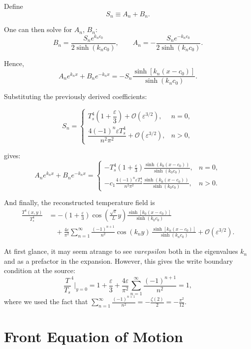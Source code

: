 \documentclass{article}
\begin{document}
Define
\[
S_n \equiv A_n + B_n.
\]

One can then solve for $A_n$, $B_n$:
\[
B_n = \frac{S_n e^{k_n c_0}}{2\sinh(k_n c_0)}, 
\qquad
A_n = -\frac{S_n e^{-k_n c_0}}{2\sinh(k_n c_0)}.
\]

Hence,
\[
A_n e^{k_n x} + B_n e^{-k_n x}
= - S_n \frac{\sinh[k_n(x-c_0)]}{\sinh(k_n c_0)}.
\]

Substituting the previously derived coefficients:

\[
S_n =
\begin{cases}
T_s^4\!\left(1+\dfrac{\varepsilon}{3}\right) + \mathcal{O}(\varepsilon^{3/2}), & n=0,\\[8pt]
\dfrac{4(-1)^n \varepsilon T_s^4}{n^2\pi^2} + \mathcal{O}(\varepsilon^{3/2}), & n>0,
\end{cases}
\]

gives:
\begin{equation}
    A_n e^{k_n x} + B_n e^{-k_n x} =
    \begin{cases}
        - T_s^4 (1+\frac{\varepsilon}{3}) \frac{\sinh(k_0(x-c_0))}{\sinh(k_0 c_0)}, & n=0,\\[6pt]
        -c_1 \frac{4(-1)^n \varepsilon T_s^4}{n^2\pi^2}\frac{\sinh(k_0(x-c_0))}{\sinh(k_0 c_0)}, & n>0.
    \end{cases}
\end{equation}
 
And finally, the reconstructed temperature field is
\begin{equation}
\begin{split}
\frac{T^4(x,y)}{T_s^4}
&=
-\left(1+\frac{\varepsilon}{3}\right) \cos\!\left(\frac{\sqrt{\varepsilon}}{L}y\right) \frac{\sinh[k_0(x-c_0)]}{\sinh(k_0 c_0)} \\
&\quad+ \frac{4\varepsilon}{\pi^2} \sum_{n=1}^{\infty} \frac{(-1)^{n+1}}{n^2} \cos(k_n y)\, \frac{\sinh[k_n(x-c_0)]}{\sinh(k_n c_0)} + \mathcal{O}(\varepsilon^{3/2}).
\end{split}
\end{equation}

At first glance, it may seem atrange to see $varepsilon$ both in the eigenvalues $k_n$ and as a prefactor in the expansion. However, this gives the write boundary condition at the source:
\[
\frac{T}{T_s}^4 \bigg|_{y=0} = 1+ \frac{\varepsilon}{3} + \frac{4\varepsilon}{\pi^2}\sum_{n=1}^\infty \frac{(-1)^{n+1}}{n^2} = 1,
\]
where we used the fact that $\sum_{n=1}^\infty \frac{(-1)^{n+1}}{n^2} = -\frac{\zeta(2)}{2} = -\frac{\pi^2}{12}$.


\section{Front Equation of Motion}
\end{document}
